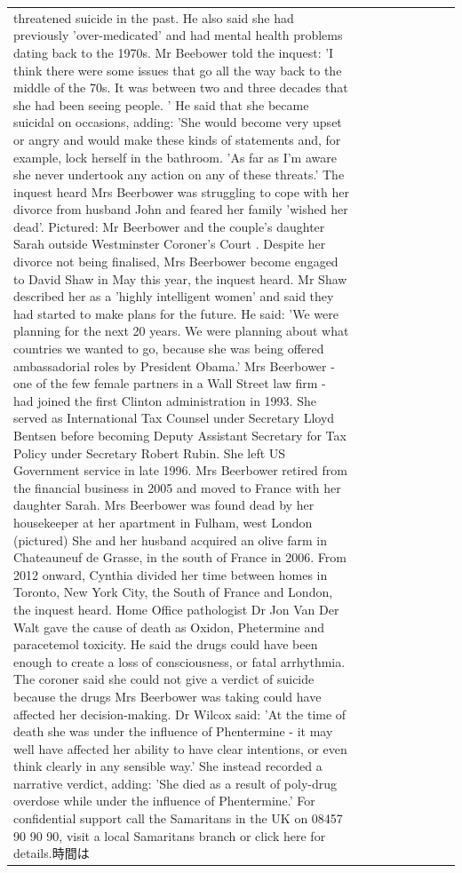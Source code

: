 \begin{table}[H]
\begin{tabular}{lllrlllll}
threatened suicide in the past. He also said she had previously 'over-medicated' and had mental health problems dating back to the 1970s. Mr Beebower told the inquest: 'I think there were some issues that go all the way back to the middle of the 70s. It was between two and three decades that she had been seeing people. ' He said that she became suicidal on occasions, adding: 'She would become very upset or angry and would make these kinds of statements and, for example, lock herself in the bathroom. 'As far as I'm aware she never undertook any action on any of these threats.' The inquest heard Mrs Beerbower was struggling to cope with her divorce from husband John and feared her family 'wished her dead'. Pictured: Mr Beerbower and the couple's daughter Sarah outside Westminster Coroner's Court . Despite her divorce not being finalised, Mrs Beerbower become engaged to David Shaw in May this year, the inquest heard. Mr Shaw described her as a 'highly intelligent women' and said they had started to make plans for the future. He said: 'We were planning for the next 20 years. We were planning about what countries we wanted to go, because she was being offered ambassadorial roles by President Obama.' Mrs Beerbower - one of the few female partners in a Wall Street law firm - had joined the first Clinton administration in 1993. She served as International Tax Counsel under Secretary Lloyd Bentsen before becoming Deputy Assistant Secretary for Tax Policy under Secretary Robert Rubin. She left US Government service in late 1996. Mrs Beerbower retired from the financial business in 2005 and moved to France with her daughter Sarah. Mrs Beerbower was found dead by her housekeeper at her apartment in Fulham, west London (pictured) She and her husband acquired an olive farm in Chateauneuf de Grasse, in the south of France in 2006. From 2012 onward, Cynthia divided her time between homes in Toronto, New York City, the South of France and London, the inquest heard. Home Office pathologist Dr Jon Van Der Walt gave the cause of death as Oxidon, Phetermine and paracetemol toxicity. He said the drugs could have been enough to create a loss of consciousness, or fatal arrhythmia. The coroner said she could not give a verdict of suicide because the drugs Mrs Beerbower was taking could have affected her decision-making. Dr Wilcox said: 'At the time of death she was under the influence of Phentermine - it may well have affected her ability to have clear intentions, or even think clearly in any sensible way.' She instead recorded a narrative verdict, adding: 'She died as a result of poly-drug overdose while under the influence of Phentermine.' For confidential support call the Samaritans in the UK on 08457 90 90 90, visit a local Samaritans branch or click here for details.時間は \\

\end{tabular}
\end{table}
